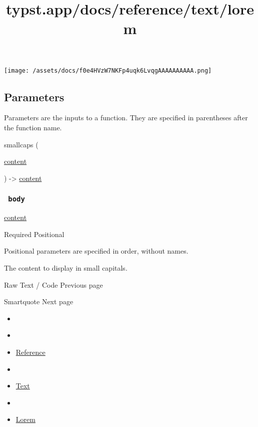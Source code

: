 \texttt{[image: /assets/docs/f0e4HVzW7NKFp4uqk6LvqgAAAAAAAAAA.png]}

\subsection{\texorpdfstring{{ Parameters
}}{ Parameters }}\label{parameters}

\label{parameters-tooltip}
Parameters are the inputs to a function. They are specified in
parentheses after the function name.

{ smallcaps } (

{ \href{/docs/reference/foundations/content/}{content} }

) -\textgreater{} \href{/docs/reference/foundations/content/}{content}

\subsubsection{\texorpdfstring{\texttt{\ body\ }}{ body }}\label{parameters-body}

\href{/docs/reference/foundations/content/}{content}

{Required} {{ Positional }}

\label{parameters-body-positional-tooltip}
Positional parameters are specified in order, without names.

The content to display in small capitals.

\href{/docs/reference/text/raw/}{\pandocbounded{}}

{ Raw Text / Code } { Previous page }

\href{/docs/reference/text/smartquote/}{\pandocbounded{}}

{ Smartquote } { Next page }


\title{typst.app/docs/reference/text/lorem}

\begin{itemize}
\tightlist
\item
  \href{/docs}{}
\item
  
\item
  \href{/docs/reference/}{Reference}
\item
  
\item
  \href{/docs/reference/text/}{Text}
\item
  
\item
  \href{/docs/reference/text/lorem/}{Lorem}
\end{itemize}

